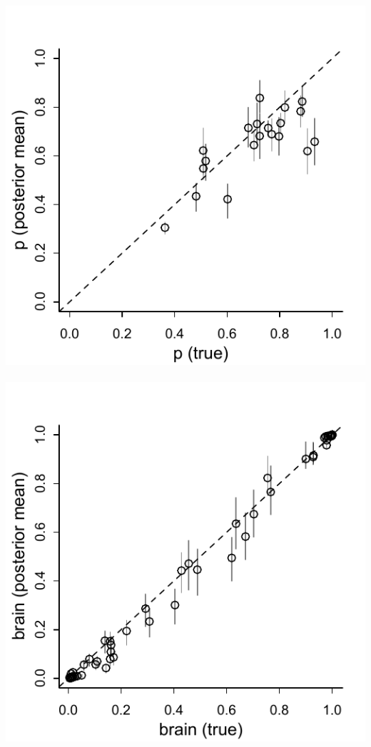 \documentclass[reqno ,11pt]{amsart}
\begin{document}
\begin{center}
	\includegraphics[scale=0.7]{fig_validate_p.pdf}~\includegraphics[scale=0.7]{fig_validate_brain.pdf}
\end{center}

\clearpage
 

\end{document}
